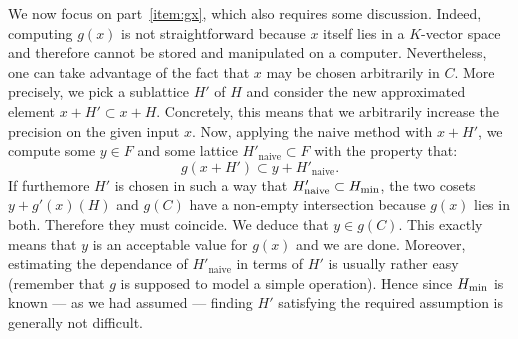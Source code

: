 \documentclass{jT}
\numberwithin{equation}{section}
\theoremstyle{definition}
\renewcommand{\min}{\text{\rm min}}
\begin{document}
We now focus on part~\eqref{item:gx}, which also requires some 
discussion. Indeed, computing $g(x)$ is not straightforward because $x$ 
itself lies in a $K$-vector space and therefore cannot be stored and 
manipulated on a computer. Nevertheless, one can take advantage of the 
fact that $x$ may be chosen arbitrarily in $C$. More precisely, we pick 
a sublattice $H'$ of $H$ and consider the new approximated element $x+H' 
\subset x+H$. Concretely, this means that we arbitrarily increase the 
precision on the given input $x$. Now, applying the naive method with 
$x+H'$, we compute some $y \in F$ and some lattice $H'_{\text{naive}} 
\subset F$ with the property that:
$$g(x+H') \subset y + H'_{\text{naive}}.$$
If furthemore $H'$ is chosen in such a way that $H'_{\text{naive}} 
\subset H_\min$, the two cosets $y + g'(x)(H)$ and $g(C)$ have a 
non-empty intersection because $g(x)$ lies in both. Therefore they 
must coincide. We deduce that $y \in g(C)$. This exactly means that
$y$ is an acceptable value for $g(x)$ and we are done.
Moreover, estimating the dependance of $H'_{\text{naive}}$ in terms 
of $H'$ is usually rather easy (remember that $g$ is supposed to model
a simple operation). Hence since $H_\min$ is known --- as
we had assumed --- finding $H'$ satisfying the required assumption is
generally not difficult. 
\end{document}
